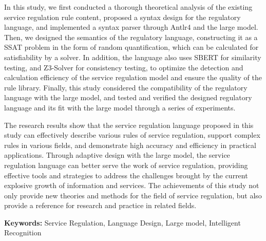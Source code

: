 In this study, we first conducted a thorough theoretical analysis of the existing service regulation rule content, proposed a syntax design for the regulatory language, and implemented a syntax parser through Antlr4 and the large model. Then, we designed the semantics of the regulatory language, constructing it as a SSAT problem in the form of random quantification, which can be calculated for satisfiability by a solver. In addition, the language also uses SBERT for similarity testing, and Z3-Solver for consistency testing, to optimize the detection and calculation efficiency of the service regulation model and ensure the quality of the rule library. Finally, this study considered the compatibility of the regulatory language with the large model, and tested and verified the designed regulatory language and its fit with the large model through a series of experiments.

The research results show that the service regulation language proposed in this study can effectively describe various rules of service regulation, support complex rules in various fields, and demonstrate high accuracy and efficiency in practical applications. Through adaptive design with the large model, the service regulation language can better serve the work of service regulation, providing effective tools and strategies to address the challenges brought by the current explosive growth of information and services. The achievements of this study not only provide new theories and methods for the field of service regulation, but also provide a reference for research and practice in related fields.

\vspace{1\baselineskip}
\noindent \textbf{Keywords:} Service Regulation, Language Design, Large model, Intelligent Recognition